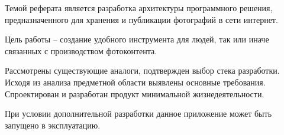 
Темой реферата является разработка архитектуры программного решения, предназначенного для хранения и публикации фотографий в сети интернет.

Цель работы – создание удобного инструмента для людей, так или иначе связанных с производством фотоконтента.

Рассмотрены существующие аналоги, подтвержден выбор стека разработки. 
Исходя из анализа предметной области выявлены основные требования. 
Спроектирован и разработан продукт минимальной жизнедеятельности.

При условии дополнительной разработки данное приложение может быть запущено в эксплуатацию.

\clearpage